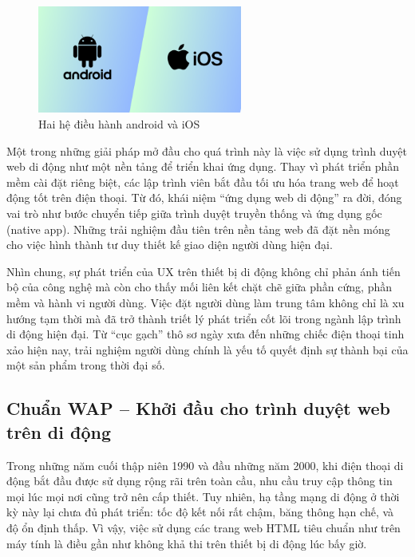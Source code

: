\begin{figure}[h]
  \centering
  \includegraphics[width=0.6\textwidth]{images/iOS-vs-Android.png}
  \caption{Hai hệ điều hành android và iOS}
  \label{fig:fig6}
\end{figure}

  \begin{flushleft}
    \hspace*{0.8cm}Một trong những giải pháp mở đầu cho quá trình này là việc sử dụng trình duyệt web di động như một nền tảng để triển khai ứng dụng. Thay vì phát triển phần mềm cài đặt riêng biệt, các lập trình viên bắt đầu tối ưu hóa trang web để hoạt động tốt trên điện thoại. Từ đó, khái niệm “ứng dụng web di động” ra đời, đóng vai trò như bước chuyển tiếp giữa trình duyệt truyền thống và ứng dụng gốc (native app). Những trải nghiệm đầu tiên trên nền tảng web đã đặt nền móng cho việc hình thành tư duy thiết kế giao diện người dùng hiện đại.
  \end{flushleft}

  \begin{flushleft}
    \hspace*{0.8cm}Nhìn chung, sự phát triển của UX trên thiết bị di động không chỉ phản ánh tiến bộ của công nghệ mà còn cho thấy mối liên kết chặt chẽ giữa phần cứng, phần mềm và hành vi người dùng. Việc đặt người dùng làm trung tâm không chỉ là xu hướng tạm thời mà đã trở thành triết lý phát triển cốt lõi trong ngành lập trình di động hiện đại. Từ “cục gạch” thô sơ ngày xưa đến những chiếc điện thoại tinh xảo hiện nay, trải nghiệm người dùng chính là yếu tố quyết định sự thành bại của một sản phẩm trong thời đại số.
  \end{flushleft}

\subsection{Chuẩn WAP – Khởi đầu cho trình duyệt web trên di động}
\renewcommand{\labelitemi}{--}    
\begin{flushleft}
  \hspace*{0.8cm}Trong những năm cuối thập niên 1990 và đầu những năm 2000, khi điện thoại di động bắt đầu được sử dụng rộng rãi trên toàn cầu, nhu cầu truy cập thông tin mọi lúc mọi nơi cũng trở nên cấp thiết. Tuy nhiên, hạ tầng mạng di động ở thời kỳ này lại chưa đủ phát triển: tốc độ kết nối rất chậm, băng thông hạn chế, và độ ổn định thấp. Vì vậy, việc sử dụng các trang web HTML tiêu chuẩn như trên máy tính là điều gần như không khả thi trên thiết bị di động lúc bấy giờ.
  \end{flushleft}
  
